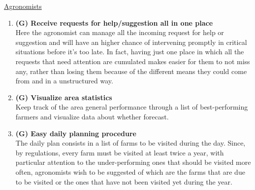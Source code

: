 \documentclass[table, 12pt]{article}
\begin{document}
\underline{Agronomists}
\begin{enumerate}
    \item \textbf{(G) Receive requests for help/suggestion all in one place}\\
    Here the agronomist can manage all the incoming request for help or suggestion and will have an higher chance of intervening promptly in critical situations before it's too late. In fact, having just one place in which all the requests that need attention are cumulated makes easier for them to not miss any, rather than losing them because of the different means they could come from and in a unstructured way.
    \item \textbf{(G) Visualize area statistics}\\
    Keep track of the area general performance through a list of best-performing farmers and visualize data about whether forecast.
    \item \textbf{(G) Easy daily planning procedure}\\
    The daily plan consists in a list of farms to be visited during the day.
    Since, by regulations, every farm must be visited at least twice a year, with particular attention to the under-performing ones that should be visited more often, agronomists wish to be suggested of which are the farms that are due to be visited or the ones that have not been visited yet during the year.
\end{enumerate}
\end{document}
